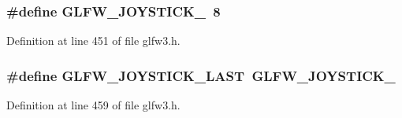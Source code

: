 \subsubsection[{G\+L\+F\+W\+\_\+\+J\+O\+Y\+S\+T\+I\+C\+K\+\_\+9}]{\setlength{\rightskip}{0pt plus 5cm}\#define G\+L\+F\+W\+\_\+\+J\+O\+Y\+S\+T\+I\+C\+K\+\_~8}\label{group__joysticks_ga87689d47df0ba6f9f5fcbbcaf7b3cecf}


Definition at line 451 of file glfw3.\+h.

\hypertarget{group__joysticks_ga9ca13ebf24c331dd98df17d84a4b72c9}{}
\subsubsection[{G\+L\+F\+W\+\_\+\+J\+O\+Y\+S\+T\+I\+C\+K\+\_\+\+L\+A\+S\+T}]{\setlength{\rightskip}{0pt plus 5cm}\#define G\+L\+F\+W\+\_\+\+J\+O\+Y\+S\+T\+I\+C\+K\+\_\+\+L\+A\+S\+T~{\bf G\+L\+F\+W\+\_\+\+J\+O\+Y\+S\+T\+I\+C\+K\+\_}}\label{group__joysticks_ga9ca13ebf24c331dd98df17d84a4b72c9}


Definition at line 459 of file glfw3.\+h.

